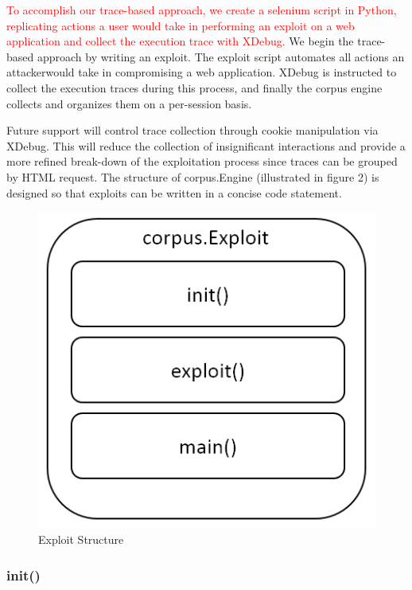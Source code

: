 \documentclass[letterpaper,twocolumn,10pt]{article}
\begin{document}
\textcolor{red}{To accomplish our trace-based approach, we create a selenium script in Python, replicating actions a user would take in performing an exploit on a web application and collect the execution trace with XDebug.}
We begin the trace-based approach by writing an exploit. The exploit script automates all actions an attackerwould take in compromising a web application. XDebug is instructed to collect the execution traces during this process, and finally the corpus engine collects and organizes them on a per-session basis.

  Future support will control trace collection through cookie manipulation via XDebug. This will reduce the collection of insignificant interactions and provide a more refined break-down of the exploitation process since traces can be grouped by HTML request.  The structure of corpus.Engine (illustrated in figure 2) is designed so that exploits can be written in a concise code statement.

\begin{figure}[!tp]
\begin{center}
\includegraphics[scale=.5]{Corpus_Exploit.PNG}
\end{center}
\caption{Exploit Structure}
\end{figure}

\subsubsection{init()}
\end{document}
